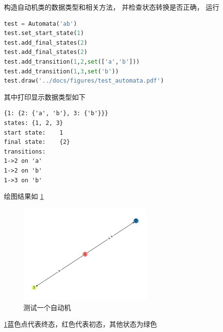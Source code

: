 \documentclass[../main.tex]{subfiles}
\begin{document}
构造自动机类的数据类型和相关方法，
并检查状态转换是否正确，
运行
\begin{lstlisting}[language=python,numbers=none]
test = Automata('ab')
test.set_start_state(1)
test.add_final_states(2)
test.add_final_states(2)
test.add_transition(1,2,set(['a','b']))
test.add_transition(1,3,set('b'))
test.draw('../docs/figures/test_automata.pdf')
\end{lstlisting}
其中打印显示数据类型如下
\begin{lstlisting}
{1: {2: {'a', 'b'}, 3: {'b'}}}
states: {1, 2, 3}
start state:    1
final state:    {2}
transitions:
1->2 on 'a'
1->2 on 'b'
1->3 on 'b'
\end{lstlisting}

绘图结果如%
\cref{fig:testautomata}
\begin{figure}[H]
  \centering
  \includegraphics[width = 0.6\textwidth]{test_automata}
  \caption{测试一个自动机}
  \label{fig:testautomata}
\end{figure}
\cref{fig:testautomata}蓝色点代表终态，红色代表初态，其他状态为绿色
\end{document}
